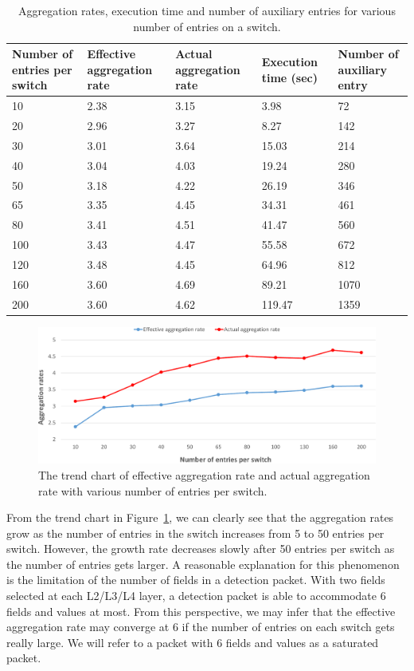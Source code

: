 \begin{table}
\centering
\caption{Aggregation rates, execution time and number of auxiliary entries for various number of entries on a switch.}
\begin{tabular}{|p{1.8cm}|p{2.6cm}|p{2.6cm}|p{1.9cm}|p{2.8cm}|}
\hline Number of entries per switch & Effective aggregation rate & Actual aggregation rate & Execution time (sec) & Number of auxiliary entry \\
\hline
\hline 10 & 2.38 & 3.15 & 3.98 & 72 \\
\hline 20 & 2.96 & 3.27 & 8.27 & 142 \\
\hline 30 & 3.01 & 3.64 & 15.03 & 214 \\
\hline 40 & 3.04 & 4.03 & 19.24 & 280 \\
\hline 50 & 3.18 & 4.22 & 26.19 & 346 \\
\hline 65 & 3.35 & 4.45 & 34.31 & 461 \\
\hline 80 & 3.41 & 4.51 & 41.47 & 560 \\
\hline 100 & 3.43 & 4.47 & 55.58 & 672 \\
\hline 120 & 3.48 & 4.45 & 64.96 & 812 \\
\hline 160 & 3.60 & 4.69 & 89.21 & 1070 \\
\hline 200 & 3.60 & 4.62 & 119.47 & 1359 \\
\hline 
\end{tabular}
\label{table:different_entry_per_switch}
\end{table}

\begin{figure}
\centering
\includegraphics[width=1\textwidth]{figures/exp_entrynum_trend.pdf}
\caption{The trend chart of effective aggregation rate and actual aggregation rate with various number of entries per switch.}
\label{exp_entrynum_trend}
\end{figure}

From the trend chart in Figure~\ref{exp_entrynum_trend}, we can clearly see that the aggregation rates grow as the number of entries in the switch increases from 5 to 50 entries per switch. However, the growth rate decreases slowly after 50 entries per switch as the number of entries gets larger. A reasonable explanation for this phenomenon is the limitation of the number of fields in a detection packet.\sout{} With two fields selected at each L2/L3/L4 layer, a detection packet is able to accommodate 6 fields and values at most. From this perspective, we may infer that the effective aggregation rate may converge at 6 if the number of entries on each switch gets really large. We will refer to a packet with 6 fields and values as a saturated packet.


